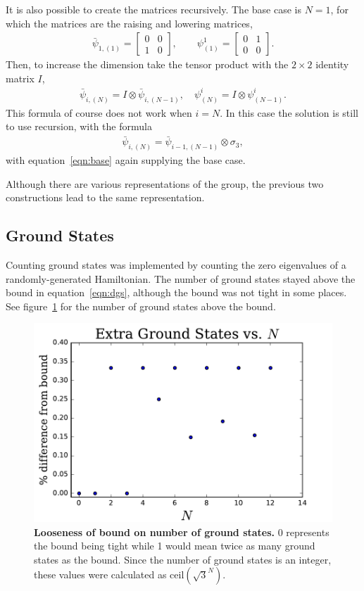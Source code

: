 \documentclass[12pt]{article} %
\begin{document}
It is also possible to create the matrices recursively. The base case is $N=1$, for which the matrices are the raising and lowering matrices,
\begin{align}
\bar\psi_{1,(1)} = \begin{bmatrix} 0&0\\1&0 \end{bmatrix}, \qquad
    \psi^1_{(1)} = \begin{bmatrix} 0&1\\0&0 \end{bmatrix}. \label{eqn:base}
\end{align}
Then, to increase the dimension take the tensor product with the $2\times 2$ identity matrix $I$,
\begin{align}
\bar\psi_{i,(N)} = I\otimes\bar\psi_{i,(N-1)},\quad \psi^i_{(N)} = I\otimes 
	\psi^i_{(N-1)}.
\end{align}
This formula of course does not work when $i=N$. In this case the solution is still to use recursion, with the formula
\begin{align}
\bar\psi_{i,(N)} = \bar\psi_{i-1,(N-1)}\otimes\sigma_3,
\end{align}
with equation~\ref{eqn:base} again supplying the base case.

Although there are various representations of the group, the previous two constructions lead to the same representation. 

\subsection{Ground States} \emph{}

Counting ground states was implemented by counting the zero eigenvalues of a randomly-generated Hamiltonian. The number of ground states stayed above the bound in equation~\ref{eqn:dgs}, although the bound was not tight in some places. See figure~\ref{fig:gserr} for the number of ground states above the bound.

\begin{figure}
	\centering
	\includegraphics[width=.5\textwidth]{gserr}
	\caption{\textbf{Looseness of bound on number of ground states.} 0 represents the bound being tight while 1 would mean twice as many ground states as the bound. Since the number of ground states is an integer, these values were calculated as $\text{ceil}(\sqrt{3}^N)$.}
	\label{fig:gserr}
\end{figure}
\end{document}
